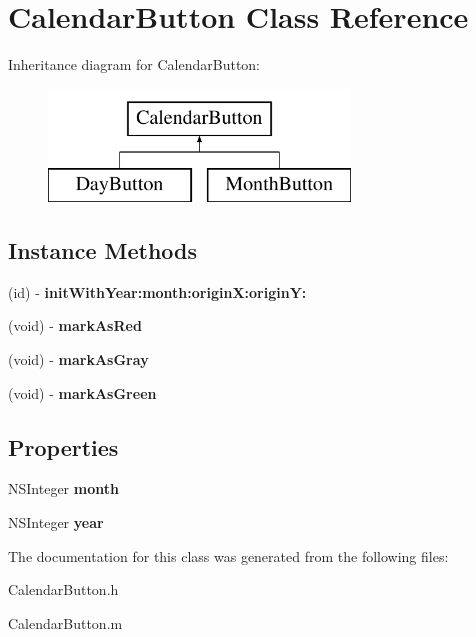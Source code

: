\hypertarget{interface_calendar_button}{\section{Calendar\+Button Class Reference}
\label{interface_calendar_button}
}
Inheritance diagram for Calendar\+Button\+:\begin{figure}[H]
\begin{center}
\leavevmode
\includegraphics[height=3.000000cm]{interface_calendar_button}
\end{center}
\end{figure}
\subsection*{Instance Methods}
\begin{DoxyCompactItemize}
\item 
\hypertarget{interface_calendar_button_a575053cfafe6a9790ff7b823e67cdd8f}{(id) -\/ {\bfseries init\+With\+Year\+:month\+:origin\+X\+:origin\+Y\+:}}\label{interface_calendar_button_a575053cfafe6a9790ff7b823e67cdd8f}

\item 
\hypertarget{interface_calendar_button_ac19bd8ddd5723e4700bfd15bc31791e6}{(void) -\/ {\bfseries mark\+As\+Red}}\label{interface_calendar_button_ac19bd8ddd5723e4700bfd15bc31791e6}

\item 
\hypertarget{interface_calendar_button_a588a452598d23eeeeb201003fbab896e}{(void) -\/ {\bfseries mark\+As\+Gray}}\label{interface_calendar_button_a588a452598d23eeeeb201003fbab896e}

\item 
\hypertarget{interface_calendar_button_adb8abbee02c42e396d6d23eb61bd9d1f}{(void) -\/ {\bfseries mark\+As\+Green}}\label{interface_calendar_button_adb8abbee02c42e396d6d23eb61bd9d1f}

\end{DoxyCompactItemize}
\subsection*{Properties}
\begin{DoxyCompactItemize}
\item 
\hypertarget{interface_calendar_button_a0376fff10e4b7543fda1c00b81585828}{N\+S\+Integer {\bfseries month}}\label{interface_calendar_button_a0376fff10e4b7543fda1c00b81585828}

\item 
\hypertarget{interface_calendar_button_ad84a0f3277c87c767e149d4498bb94b2}{N\+S\+Integer {\bfseries year}}\label{interface_calendar_button_ad84a0f3277c87c767e149d4498bb94b2}

\end{DoxyCompactItemize}


The documentation for this class was generated from the following files\+:\begin{DoxyCompactItemize}
\item 
Calendar\+Button.\+h\item 
Calendar\+Button.\+m\end{DoxyCompactItemize}
